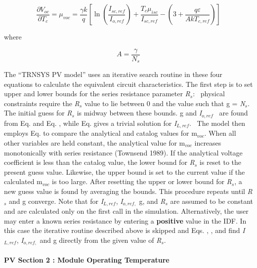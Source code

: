 \begin{equation}
\frac{{\partial {V_{oc}}}}{{\partial {T_c}}} = {\mu_{voc}} = \frac{{\gamma k}}{q}\left[ {\ln \left( {\frac{{{I_{sc,ref}}}}{{{I_{o,ref}}}}} \right) + \frac{{{T_c}\mu_{isc}^{}}}{{{I_{sc,ref}}}} - \left( {3 + \frac{{q\varepsilon }}{{Ak{T_{c,ref}}}}} \right)} \right]
\end{equation}

where

\begin{equation}
A = \frac{\gamma }{{{N_s}}}
\end{equation}

The ``TRNSYS PV model'' uses an iterative search routine in these four equations to calculate the equivalent circuit characteristics. The first step is to set upper and lower bounds for the series resistance parameter \emph{R\(_{s}\)}:~ physical constraints require the \emph{R\(_{s}\)} value to lie between 0 and the value such that g = \emph{N\(_{s}\)}. The initial guess for \emph{R\(_{s}\)} is midway between these bounds. g and \emph{I\(_{o,ref}\)} ~are found from Eq. and Eq. , while Eq. gives a trivial solution for \emph{I\(_{L,ref}\)}.~ The model then employs Eq. to compare the analytical and catalog values for m\(_{voc}\). When all other variables are held constant, the analytical value for m\(_{voc}\) increases monotonically with series resistance (Townsend 1989). If the analytical voltage coefficient is less than the catalog value, the lower bound for \emph{R\(_{s}\)} is reset to the present guess value. Likewise, the upper bound is set to the current value if the calculated m\(_{voc}\) is too large. After resetting the upper or lower bound for \emph{R\(_{s}\)}, a new guess value is found by averaging the bounds. This procedure repeats until \emph{R\(_{s}\)} and g converge. Note that for \emph{I\(_{L,ref}\)}, \emph{I\(_{o,ref,}\)} g, and \emph{R\(_{s}\)} are assumed to be constant and are calculated only on the first call in the simulation. Alternatively, the user may enter a known series resistance by entering a \textbf{positive} value in the IDF. In this case the iterative routine described above is skipped and Eqs. , , and find \emph{I\(_{L,ref}\)}, \emph{I\(_{o,ref,}\)} and g directly from the given value of \emph{R\(_{s}\)}.

\paragraph{PV Section 2 : Module Operating Temperature}\label{pv-section-2-module-operating-temperature}

